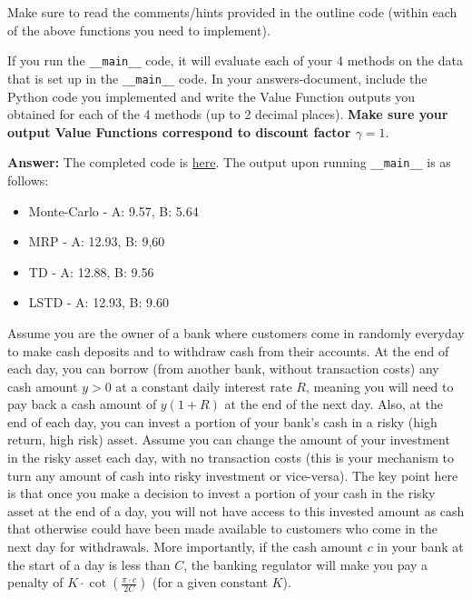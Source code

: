 \documentclass[12pt]{exam}
\begin{document}
\begin{questions}
Make sure to read the comments/hints provided in the outline code (within each of the above functions you need to implement).

If you run the \lstinline{__main__} code, it will evaluate each of your 4 methods on the data that is set up in the \lstinline{__main__} code. In your answers-document, include the Python code you implemented and write the Value Function outputs you obtained for each of the 4 methods (up to 2 decimal places). {\bf Make sure your output Value Functions correspond to discount factor $\gamma = 1$}.

{\bf Answer: } The completed code is \href{https://github.com/coverdrive/MDP-DP-RL/blob/master/src/examples/exam_problems/mrp_tdmc.py}{here}.
The output upon running \lstinline{__main__} is as follows:
\begin{itemize}
\item Monte-Carlo - A: 9.57, B: 5.64
\item MRP - A: 12.93, B: 9,60
\item TD - A: 12.88, B: 9.56
\item LSTD - A: 12.93, B: 9.60
\end{itemize}

\vspace{3mm}

\question Assume you are the owner of a bank where customers come in randomly everyday to make cash deposits and to withdraw cash from their accounts. At the end of each day, you can borrow (from another bank, without transaction costs) any cash amount $y > 0$ at a constant daily interest rate $R$, meaning you will need to pay back a cash amount of $y(1+R)$ at the end of the next day. Also, at the end of each day, you can invest a portion of your bank's cash in a risky (high return, high risk) asset. Assume you can change the amount of your investment in the risky asset each day, with no transaction costs (this is your mechanism to turn any amount of cash into risky investment or vice-versa). The key point here is that once you make a decision to invest a portion of your cash in the risky asset at the end of a day, you will not have access to this invested amount as cash that otherwise could have been made available to customers who come in the next day for withdrawals. More importantly, if the cash amount $c$ in your bank at the start of a day is less than $C$, the banking regulator will make you pay a penalty of $K \cdot \cot(\frac {\pi \cdot c}{2C})$ (for a given constant $K$).


\end{questions}
\end{document}
